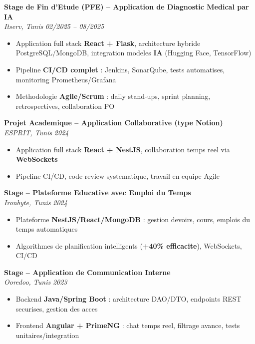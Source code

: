 \documentclass[10pt,a4paper]{article}
\begin{document}
{\small

\textbf{Stage de Fin d'Etude (PFE) -- Application de Diagnostic Medical par IA}\\[1pt]
\textit{Itserv, Tunis} \hfill \textit{02/2025 -- 08/2025}
\begin{itemize}[leftmargin=12pt,itemsep=2pt,topsep=3pt,parsep=0pt]
  \item Application full stack \textbf{React + Flask}, architecture hybride PostgreSQL/MongoDB, integration modeles \textbf{IA} (Hugging Face, TensorFlow)
  \item Pipeline \textbf{CI/CD complet} : Jenkins, SonarQube, tests automatises, monitoring Prometheus/Grafana
  \item Methodologie \textbf{Agile/Scrum} : daily stand-ups, sprint planning, retrospectives, collaboration PO
\end{itemize}

\vspace{3pt}
\textbf{Projet Academique -- Application Collaborative (type Notion)}\\[1pt]
\textit{ESPRIT, Tunis} \hfill \textit{2024}
\begin{itemize}[leftmargin=12pt,itemsep=2pt,topsep=3pt,parsep=0pt]
  \item Application full stack \textbf{React + NestJS}, collaboration temps reel via \textbf{WebSockets}
  \item Pipeline CI/CD, code review systematique, travail en equipe Agile
\end{itemize}

\vspace{3pt}
\textbf{Stage -- Plateforme Educative avec Emploi du Temps}\\[1pt]
\textit{Ironbyte, Tunis} \hfill \textit{2024}
\begin{itemize}[leftmargin=12pt,itemsep=2pt,topsep=3pt,parsep=0pt]
  \item Plateforme \textbf{NestJS/React/MongoDB} : gestion devoirs, cours, emplois du temps automatiques
  \item Algorithmes de planification intelligents (\textbf{+40\% efficacite}), WebSockets, CI/CD
\end{itemize}

\vspace{3pt}
\textbf{Stage -- Application de Communication Interne}\\[1pt]
\textit{Ooredoo, Tunis} \hfill \textit{2023}
\begin{itemize}[leftmargin=12pt,itemsep=2pt,topsep=3pt,parsep=0pt]
  \item Backend \textbf{Java/Spring Boot} : architecture DAO/DTO, endpoints REST securises, gestion des acces
  \item Frontend \textbf{Angular + PrimeNG} : chat temps reel, filtrage avance, tests unitaires/integration
\end{itemize}

}
\end{document}
